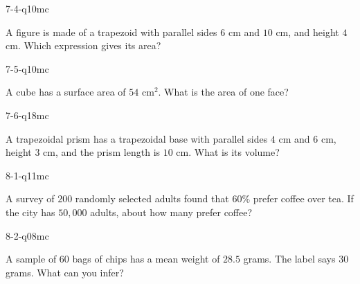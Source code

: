 \begin{practiceQuestion}{7-4-q10}{mc}
\begin{questionText}
A figure is made of a trapezoid with parallel sides $6$ cm and $10$ cm, and height $4$ cm. Which expression gives its area?
\end{questionText}
\end{practiceQuestion}

\begin{practiceQuestion}{7-5-q10}{mc}
\begin{questionText}
A cube has a surface area of $54$ cm$^2$. What is the area of one face?
\end{questionText}
\end{practiceQuestion}

\begin{practiceQuestion}{7-6-q18}{mc}
\begin{questionText}
A trapezoidal prism has a trapezoidal base with parallel sides $4$ cm and $6$ cm, height $3$ cm, and the prism length is $10$ cm. What is its volume?
\end{questionText}
\end{practiceQuestion}

\begin{practiceQuestion}{8-1-q11}{mc}
\begin{questionText}
A survey of $200$ randomly selected adults found that $60\%$ prefer coffee over tea. If the city has $50{,}000$ adults, about how many prefer coffee?
\end{questionText}
\end{practiceQuestion}

\begin{practiceQuestion}{8-2-q08}{mc}
\begin{questionText}
A sample of $60$ bags of chips has a mean weight of $28.5$ grams. The label says $30$ grams. What can you infer?
\end{questionText}
\end{practiceQuestion}

